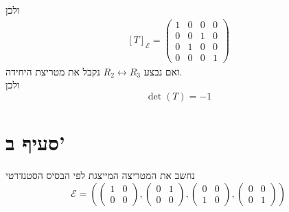 \documentclass[12pt, titlepage]{article}
\begin{document}
ולכן
\begin{gather*}
    \left[T\right]_\mathcal{E} = \begin{pmatrix}
        1 & 0 & 0 & 0 \\
        0 & 0 & 1 & 0 \\
        0 & 1 & 0 & 0 \\
        0 & 0 & 0 & 1
    \end{pmatrix}
\end{gather*}
ואם נבצע $R_2\leftrightarrow R_3$ נקבל את מטריצת היחידה.\\
ולכן 
\[
    \boxed{\det\left(T\right) = -1}
\]
\section*{סעיף ב'}
נחשב את המטריצה המייצגת
לפי הבסיס הסטנדרטי 
\[
    \mathcal{E}=\left(\begin{pmatrix} 1 & 0 \\ 0 & 0 \end{pmatrix},\begin{pmatrix} 0 & 1 \\ 0 & 0 \end{pmatrix},\begin{pmatrix} 0 & 0 \\ 1 & 0 \end{pmatrix},\begin{pmatrix} 0 & 0 \\ 0 & 1 \end{pmatrix}\right) \]
\end{document}
